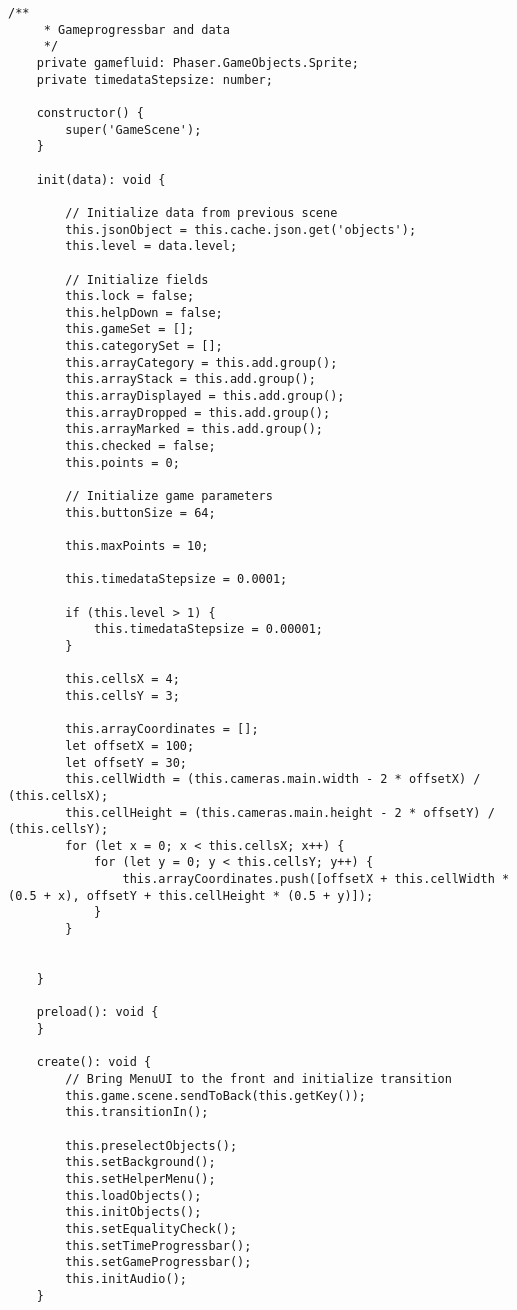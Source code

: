 \begin{lstlisting}[style=TypeScript, caption={gameScene.ts}]
    /**
     * Gameprogressbar and data
     */
    private gamefluid: Phaser.GameObjects.Sprite;
    private timedataStepsize: number;

    constructor() {
        super('GameScene');
    }

    init(data): void {

        // Initialize data from previous scene
        this.jsonObject = this.cache.json.get('objects');
        this.level = data.level;

        // Initialize fields
        this.lock = false;
        this.helpDown = false;
        this.gameSet = [];
        this.categorySet = [];
        this.arrayCategory = this.add.group();
        this.arrayStack = this.add.group();
        this.arrayDisplayed = this.add.group();
        this.arrayDropped = this.add.group();
        this.arrayMarked = this.add.group();
        this.checked = false;
        this.points = 0;

        // Initialize game parameters
        this.buttonSize = 64;

        this.maxPoints = 10;

        this.timedataStepsize = 0.0001;

        if (this.level > 1) {
            this.timedataStepsize = 0.00001;
        }

        this.cellsX = 4;
        this.cellsY = 3;

        this.arrayCoordinates = [];
        let offsetX = 100;
        let offsetY = 30;
        this.cellWidth = (this.cameras.main.width - 2 * offsetX) / (this.cellsX);
        this.cellHeight = (this.cameras.main.height - 2 * offsetY) / (this.cellsY);
        for (let x = 0; x < this.cellsX; x++) {
            for (let y = 0; y < this.cellsY; y++) {
                this.arrayCoordinates.push([offsetX + this.cellWidth * (0.5 + x), offsetY + this.cellHeight * (0.5 + y)]);
            }
        }


    }

    preload(): void {
    }

    create(): void {
        // Bring MenuUI to the front and initialize transition
        this.game.scene.sendToBack(this.getKey());
        this.transitionIn();

        this.preselectObjects();
        this.setBackground();
        this.setHelperMenu();
        this.loadObjects();
        this.initObjects();
        this.setEqualityCheck();
        this.setTimeProgressbar();
        this.setGameProgressbar();
        this.initAudio();
    }


\end{lstlisting}

